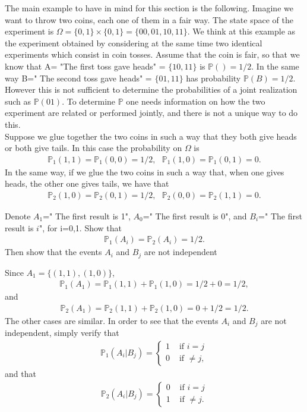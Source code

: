 \documentclass[12pt]{article}
\newcommand{\<}{{\langle \!\! \langle}}
\renewcommand{\>}{{\rangle \!\! \rangle}}
\newcommand{\bel}[2]{\begin{equation} \label{#1} \begin{split} #2
 					\end{split} \end{equation}}
\begin{document}
The main example to have in mind for this section is the following. Imagine we want to throw two coins, each one of them in a fair way. The state space of the experiment is $\Omega=\{0,1\}\times\{0,1\}=\{00,01,10,11\}$. We think at this example as the experiment obtained by considering at the same time two identical experiments which consist in coin tosses. 
Assume that the coin is fair, so that we know that A= "The first toss gave heads" = $\{10,11\}$ is $\mathbb{P}() = 1/2$. In the same way B=" The second toss gave heads" = $\{ 01,11\}$ has probability $\mathbb{P}(B)=1/2$. However this is not sufficient to determine the probabilities of a joint realization such as $\mathbb{P}(01)$. To determine $\mathbb{P}$ one needs information on how the two experiment are related or performed jointly, and there is not a unique way to do this. \\
Suppose we glue together the two coins in such a way that they both give heads or both give tails. In this case the probability on $\Omega$ is 
\bel{}{\mathbb{P}_1(1,1)=\mathbb{P}_1(0,0)=1/2,\,\,\,\,\mathbb{P}_1(1,0)=\mathbb{P}_1(0,1)=0.}
In the same way, if we glue the two coins in such a way that, when one gives heads, the other one gives tails, we have that
\bel{}{\mathbb{P}_2(1,0)=\mathbb{P}_2(0,1)=1/2,\,\,\,\,\mathbb{P}_2(0,0)=\mathbb{P}_2(1,1)=0.}

\begin{ExerciseList}

\Exercise Denote $A_1$=" The first result is 1", $A_0$=" The first result is 0", and $B_i$=" The first result is $i$", for i=0,1. 
Show that 
    \bel{}{ \mathbb{P}_1(A_i)=\mathbb{P}_2(A_i)=1/2.}
Then show that the events $A_i$ and $B_j$ are not independent

 \Answer Since $A_1=\{(1,1),(1,0)\}$,
\bel{}{\mathbb{P}_1(A_1)=\mathbb{P}_1(1,1)+\mathbb{P}_1(1,0)=1/2+0=1/2,}
and
\bel{}{\mathbb{P}_2(A_1)=\mathbb{P}_2(1,1)+\mathbb{P}_2(1,0)=0+1/2=1/2.}
The other cases are similar.
In order to see that the events $A_i$ and $B_j$ are not independent, simply verify that 
\bel{}{\mathbb{P}_1(A_i|B_j)=\begin{cases} 1 & \textrm{ if } i=j\\
0 & \textrm{ if } \neq j, 
\end{cases}}
and that 
\bel{}{\mathbb{P}_2(A_i|B_j)=\begin{cases} 0 & \textrm{ if } i=j\\
1 & \textrm{ if } \neq j. 
\end{cases}}
\end{ExerciseList}
\end{document}
